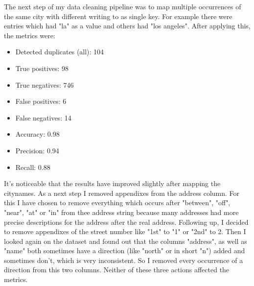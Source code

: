 \documentclass[conference]{IEEEtran}
\begin{document}
The next step of my data cleaning pipeline was to map multiple occurrences of the same city with different writing to as single key. For example there were entries which had "la" as a value and others had "los angeles". After applying this, the metrics were: 
\begin{itemize}
	\item Detected duplicates (all): 104
	\item True positives: 98
	\item True negatives: 746
	\item False positives: 6
	\item False negatives: 14
	\item Accuracy: 0.98
	\item Precision: 0.94
	\item Recall: 0.88
\end{itemize}
It's noticeable that the results have improved slightly after mapping the citynames. As a next step I removed appendixes from the address column. For this I have chosen to remove everything which occurs after "between", "off", "near", "at" or "in" from thee address string because many addresses had more precise descriptions for the address after the real address. Following up, I decided to remove appendixes of the street number like "1st" to "1" or "2nd" to 2. Then I looked again on the dataset and found out that the columns "address", as well as "name" both sometimes have a direction (like "north" or in short "n") added and sometimes don't, which is very inconsistent. So I removed every occurrence of a direction from this two columns. Neither of these three actions affected the metrics. 
\end{document}
